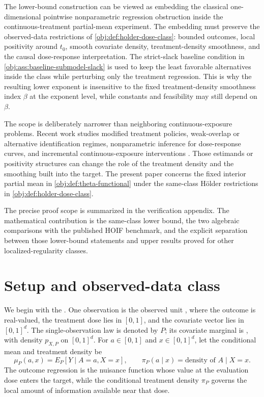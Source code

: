 \documentclass[11pt]{article}
\begin{document}
The lower-bound construction can be viewed as embedding the classical one-dimensional pointwise nonparametric regression obstruction inside the continuous-treatment partial-mean experiment. The embedding must preserve the observed-data restrictions of \cref{obj:def:holder-dose-class}: bounded outcomes, local positivity around \(t_0\), smooth covariate density, treatment-density smoothness, and the causal dose-response interpretation. The strict-slack baseline condition in \cref{obj:ass:baseline-submodel-slack} is used to keep the least favorable alternatives inside the class while perturbing only the treatment regression. This is why the resulting lower exponent is insensitive to the fixed treatment-density smoothness index \(\beta\) at the exponent level, while constants and feasibility may still depend on \(\beta\).

The scope is deliberately narrower than neighboring continuous-exposure problems. Recent work studies modified treatment policies, weak-overlap or alternative identification regimes, nonparametric inference for dose-response curves, and incremental continuous-exposure interventions \citep{hejazi2022,doss2022,hudson2023,shi2024,zhang2024,schindl2024,bonvini2024}. Those estimands or positivity structures can change the role of the treatment density and the smoothing built into the target. The present paper concerns the fixed interior partial mean in \cref{obj:def:theta-functional} under the same-class Hölder restrictions in \cref{obj:def:holder-dose-class}.

The precise proof scope is summarized in the verification appendix. The mathematical contribution is the same-class lower bound, the two algebraic comparisons with the published HOIF benchmark, and the explicit separation between those lower-bound statements and upper results proved for other localized-regularity classes.


\section{Setup and observed-data class}

We begin with the . One observation is the observed unit , where the outcome  is real-valued, the treatment dose  lies in \([0,1]\), and the covariate vector  lies in \([0,1]^d\). The single-observation law is denoted by \ensuremath{P}; its covariate marginal is , with density \(p_{X,P}\) on \([0,1]^d\). For \(a\in[0,1]\) and \(x\in[0,1]^d\), let the conditional mean and treatment density be
\[
\mu_P(a,x)=E_P[Y\mid A=a,X=x],
\qquad
\pi_P(a\mid x)=\text{density of }A\mid X=x .
\]
The outcome regression  is the nuisance function whose value at the evaluation dose enters the target, while the conditional treatment density \ensuremath{\pi_P} governs the local amount of information available near that dose.
\end{document}
